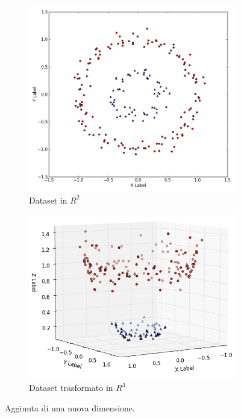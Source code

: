 \documentclass[oneside]{book}
\begin{document}
\begin{figure}[!h]

	\begin{subfigure}[b]{0.48\textwidth}

		\includegraphics[width=\linewidth]{assets/svm-non-separable-1.png}
		\caption{Dataset in $R^2$}
		\label{fig:dataset-r2}
	\end{subfigure}
	\hfill
	\begin{subfigure}[b]{0.48\textwidth}
		\includegraphics[width=\linewidth]{assets/svm-non-separable-2.png}
		\caption{Dataset trasformato in $R^3$}
		\label{fig:dataset-r3}
	\end{subfigure}%
	\caption[Caption for LOF]{Aggiunta di una nuova dimensione.\footnotemark}
\end{figure}
\end{document}
